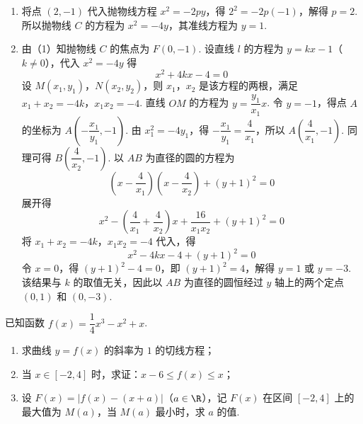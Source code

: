 \begin{solution}
\begin{enumerate}
\item 将点 \((2,-1)\) 代入抛物线方程 \(x^2=-2py\)，得 \(2^2=-2p(-1)\)，解得 \(p=2\).
所以抛物线 \(C\) 的方程为 \(x^2=-4y\)，其准线方程为 \(y=1\).

\item 由（1）知抛物线 \(C\) 的焦点为 \(F(0,-1)\).
设直线 \(l\) 的方程为 \(y=kx-1\)（\(k\ne0\)），代入 \(x^2=-4y\) 得
\[
x^2+4kx-4=0
\]
设 \(M(x_1,y_1)\)，\(N(x_2,y_2)\)，则 \(x_1\)，\(x_2\) 是该方程的两根，满足 \(x_1+x_2=-4k\)，\(x_1x_2=-4\).
直线 \(OM\) 的方程为 \(y=\dfrac{y_1}{x_1}x\). 令 \(y=-1\)，得点 \(A\) 的坐标为 \(A\left(-\dfrac{x_1}{y_1},-1\right)\).
由 \(x_1^2=-4y_1\)，得 \(-\dfrac{x_1}{y_1}=\dfrac{4}{x_1}\)，所以 \(A\left(\dfrac{4}{x_1},-1\right)\). 同理可得 \(B\left(\dfrac{4}{x_2},-1\right)\).
以 \(AB\) 为直径的圆的方程为
\[
\left(x-\frac{4}{x_1}\right)\left(x-\frac{4}{x_2}\right)+(y+1)^2=0
\]
展开得
\[
x^2-\left(\frac{4}{x_1}+\frac{4}{x_2}\right)x+\frac{16}{x_1x_2}+(y+1)^2=0
\]
将 \(x_1+x_2=-4k\)，\(x_1x_2=-4\) 代入，得
\[
x^2-4kx-4+(y+1)^2=0
\]
令 \(x=0\)，得 \((y+1)^2-4=0\)，即 \((y+1)^2=4\)，解得 \(y=1\) 或 \(y=-3\).
该结果与 \(k\) 的取值无关，因此以 \(AB\) 为直径的圆恒经过 \(y\) 轴上的两个定点 \((0,1)\) 和 \((0,-3)\).
\end{enumerate}
\end{solution}

\begin{problem}
已知函数 \(f(x)=\dfrac14x^3-x^2+x\).

\begin{enumerate}
\item 求曲线 \(y=f(x)\) 的斜率为 \(1\) 的切线方程；

\item 当 \(x\in[-2,4]\) 时，求证：\(x-6\le f(x)\le x\)；

\item 设 \(F(x)=\left|f(x)-(x+a)\right|\)（\(a\in\R\)），记 \(F(x)\) 在区间 \([-2,4]\) 上的最大值为 \(M(a)\)，当 \(M(a)\) 最小时，求 \(a\) 的值.
\end{enumerate}
\end{problem}

